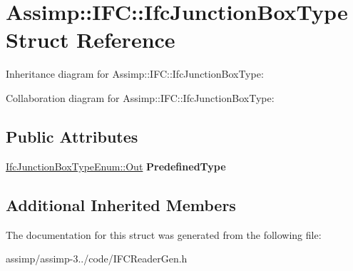 \hypertarget{struct_assimp_1_1_i_f_c_1_1_ifc_junction_box_type}{\section{Assimp\+:\+:I\+F\+C\+:\+:Ifc\+Junction\+Box\+Type Struct Reference}
\label{struct_assimp_1_1_i_f_c_1_1_ifc_junction_box_type}
}


Inheritance diagram for Assimp\+:\+:I\+F\+C\+:\+:Ifc\+Junction\+Box\+Type\+:


Collaboration diagram for Assimp\+:\+:I\+F\+C\+:\+:Ifc\+Junction\+Box\+Type\+:
\subsection*{Public Attributes}
\begin{DoxyCompactItemize}
\item 
\hypertarget{struct_assimp_1_1_i_f_c_1_1_ifc_junction_box_type_a56c339defd7899a563daf646171ff7c7}{\hyperlink{classboost_1_1shared__ptr}{Ifc\+Junction\+Box\+Type\+Enum\+::\+Out} {\bfseries Predefined\+Type}}\label{struct_assimp_1_1_i_f_c_1_1_ifc_junction_box_type_a56c339defd7899a563daf646171ff7c7}

\end{DoxyCompactItemize}
\subsection*{Additional Inherited Members}


The documentation for this struct was generated from the following file\+:\begin{DoxyCompactItemize}
\item 
assimp/assimp-\/3../code/I\+F\+C\+Reader\+Gen.\+h\end{DoxyCompactItemize}
